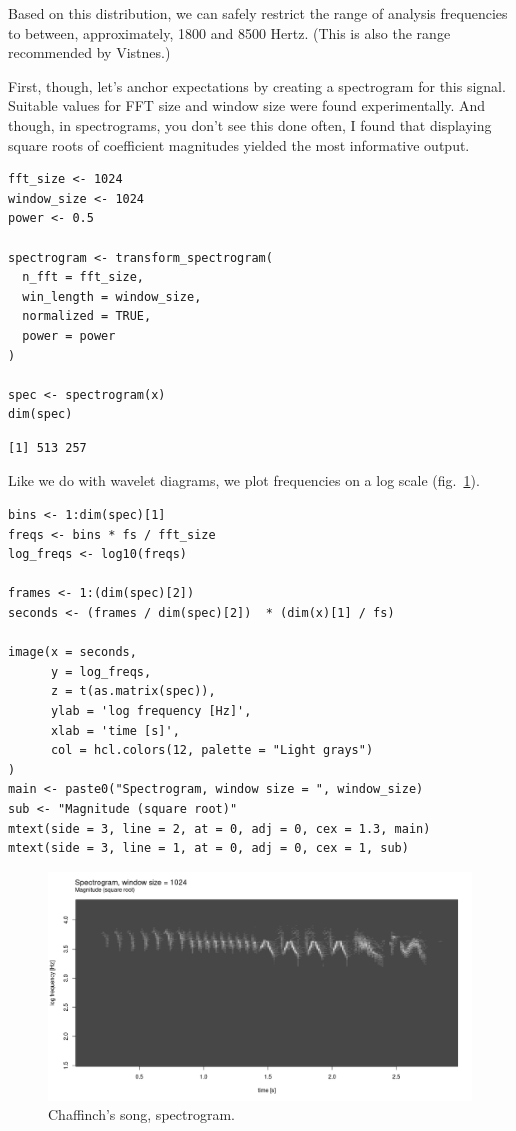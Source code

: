 \documentclass[
  letterpaper,
]{krantz}
\begin{document}
Based on this distribution, we can safely restrict the range of analysis
frequencies to between, approximately, 1800 and 8500 Hertz. (This is
also the range recommended by Vistnes.)

First, though, let's anchor expectations by creating a spectrogram for
this signal. Suitable values for FFT size and window size were found
experimentally. And though, in spectrograms, you don't see this done
often, I found that displaying square roots of coefficient magnitudes
yielded the most informative output.

\begin{verbatim}
fft_size <- 1024
window_size <- 1024
power <- 0.5

spectrogram <- transform_spectrogram(
  n_fft = fft_size,
  win_length = window_size,
  normalized = TRUE,
  power = power
)

spec <- spectrogram(x)
dim(spec)
\end{verbatim}

\begin{verbatim}
[1] 513 257
\end{verbatim}

Like we do with wavelet diagrams, we plot frequencies on a log scale
(fig.~\ref{fig-wav-chaffinch-spectrogram}).

\begin{verbatim}
bins <- 1:dim(spec)[1]
freqs <- bins * fs / fft_size
log_freqs <- log10(freqs)

frames <- 1:(dim(spec)[2])
seconds <- (frames / dim(spec)[2])  * (dim(x)[1] / fs)

image(x = seconds,
      y = log_freqs,
      z = t(as.matrix(spec)),
      ylab = 'log frequency [Hz]',
      xlab = 'time [s]',
      col = hcl.colors(12, palette = "Light grays")
)
main <- paste0("Spectrogram, window size = ", window_size)
sub <- "Magnitude (square root)"
mtext(side = 3, line = 2, at = 0, adj = 0, cex = 1.3, main)
mtext(side = 3, line = 1, at = 0, adj = 0, cex = 1, sub)
\end{verbatim}

\begin{figure}[H]

{\centering \includegraphics{images/wav-chaffinch-spectrogram.png}

}

\caption{\label{fig-wav-chaffinch-spectrogram}Chaffinch's song,
spectrogram.}

\end{figure}
\end{document}
